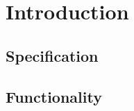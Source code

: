 %
\chapter{Introduction}
\label{Introduction}



\section{Specification}


	
\section{Functionality}

